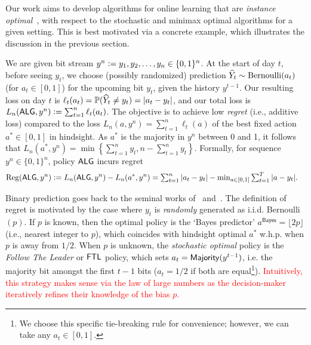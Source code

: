 Our work aims to develop algorithms for online learning that are \emph{instance optimal}~\citep{fagin2001optimal},\citep[Chapter $3$]{roughgarden2021beyond} with respect to the stochastic and minimax optimal algorithms for a given setting. This is best motivated via
a concrete example, which illustrates the discussion in the previous section. 
\begin{example}
We are given bit stream $y^n \mathrel{\mathop{:}}= y_1,y_2,\ldots,y_n\in\{0,1\}^n$.
At the start of day $t$, before seeing $y_t$, we choose (possibly randomized) prediction $\widehat{Y}_t \sim \mathrm{Bernoulli}(a_t)$ (for $a_t \in [0,1]$) for the upcoming bit $y_t$, given the history $y^{t-1}$. Our resulting loss on day $t$ is $\ell_t(a_t) = \mathbb{P}(\widehat{Y}_t \neq y_t) = |a_t - y_t|$, and our total loss is $L_n(\mathsf{ALG},y^n)\mathrel{\mathop{:}}= \sum_{t=1}^n\ell_t(a_t)$. The objective is to achieve low \emph{regret} (i.e., additive loss) compared to the loss $L_n(a,y^n)=\sum_{t=1}^n\ell_t(a)$ of the best fixed action $a^* \in[0,1]$ in hindsight. As $a^*$ is the majority in $y^n$ between 0 and 1, it follows that $L_n(a^*, y^n) = \min\left\{\sum_{t=1}^n y_t, n - \sum_{t=1}^n y_t\right\}$. Formally, for sequence $y^n \in \{0,1\}^n$, policy $\mathsf{ALG}$ incurs regret
\begin{align}
\label{eq:regdefn}
    \mathrm{Reg}(\mathsf{ALG}, y^n) &\mathrel{\mathop{:}}= L_n(\mathsf{ALG},y^n) - L_n(a^*,y^n)
    = \textstyle\sum_{t=1}^n |a_t - y_t| - \min_{a\in[0,1]}\textstyle\sum_{t=1}^T|a-y_t|.
\end{align}
\end{example}
Binary prediction goes back to the seminal works of~\cite{blackwell1956analog} and~\cite{hannan1957approximation}. The definition of regret is motivated by the case where $y_t$ is \emph{randomly} generated as i.i.d. Bernoulli$(p)$. If $p$ is known, then the optimal policy is the `Bayes predictor' $a^{\textsf{Bayes}}=\lfloor 2p\rfloor$ (i.e., nearest integer to $p$),
which coincides with hindsight optimal $a^*$ w.h.p. when $p$ is away from $1/2$. When $p$ is unknown, the \emph{stochastic optimal} policy is the \emph{Follow The Leader} or $\mathsf{FTL}$ policy, which sets $a_t=\mathsf{Majority}(y^{t-1})$, i.e. the majority bit amongst the first $t-1$ bits ($a_t=1/2$ if both are equal\footnote{We choose this specific tie-breaking rule for convenience; however, we can take any $a_t\in[0,1]$.}). \textcolor{red}{Intuitively, this strategy makes sense via the law of large numbers as the decision-maker iteratively refines their knowledge of the bias $p$.}

